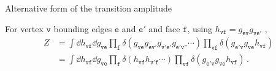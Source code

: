 \documentclass{beamer}
\begin{document}
\begin{frame}{Alternative form of the transition amplitude}
\begin{list}{\maltese}{\leftmargin=1em \itemindent=0em}
        \item<3-> For vertex $\mathtt{v}$ bounding edges $\mathtt{e}$ and $\mathtt{e'}$ and face $\mathtt{f}$, using $h_\mathtt{vf}=g_{\mathtt{ev}}g_{\mathtt{ve'}}$ ,
        \begin{align}
            Z&=\int\dd{h_\mathtt{vf}}\dd{g_\mathtt{ve}}\prod_\mathtt{f}\delta(g_\mathtt{ve}g_\mathtt{ev'}g_\mathtt{v'e'}g_\mathtt{e'v''}\cdots)\prod_\mathtt{vf}\delta(g_\mathtt{e'v}g_\mathtt{ve}h_\mathtt{vf})\,\\
            &=\int\dd{h_\mathtt{vf}}\dd{g_\mathtt{ve}}\prod_\mathtt{f}\delta(h_\mathtt{vf}h_\mathtt{v'f}\cdots)\prod_\mathtt{vf}\delta(g_\mathtt{e'v}g_\mathtt{ve}h_\mathtt{vf})\,.
        \end{align}
    \end{list}
\end{frame}
\end{document}
